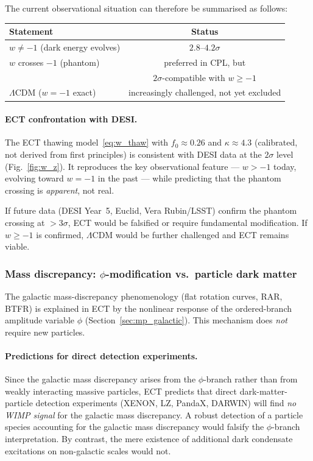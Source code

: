 \documentclass[11pt,a4paper]{article}
\numberwithin{equation}{section}
\begin{document}
\noindent
The current observational situation can therefore be
summarised as follows:
\begin{center}
\renewcommand{\arraystretch}{1.2}
\begin{tabular}{lc}
\hline\hline
Statement & Status \\
\hline
$w \neq -1$ (dark energy evolves) & $2.8$--$4.2\sigma$ \\
$w$ crosses $-1$ (phantom) &
  preferred in CPL, but \\
 & $2\sigma$-compatible with $w \geq -1$ \\
$\Lambda$CDM ($w = -1$ exact) & increasingly challenged, not yet excluded \\
\hline\hline
\end{tabular}
\end{center}

\paragraph{ECT confrontation with DESI.}
The ECT thawing model~\eqref{eq:w_thaw} with
$f_0 \approx 0.26$ and $\kappa \approx 4.3$ (calibrated,
not derived from first principles) is consistent with
DESI data at the $2\sigma$ level
(Fig.~\ref{fig:w_z}).  It reproduces the key observational
feature --- $w > -1$ today, evolving toward $w = -1$
in the past --- while predicting that the phantom crossing
is \emph{apparent}, not real.

If future data (DESI Year~5, Euclid, Vera Rubin/LSST)
confirm the phantom crossing at $>3\sigma$, ECT would be
falsified or require fundamental modification.  If
$w \geq -1$ is confirmed, $\Lambda$CDM would be further
challenged and ECT remains viable.


\subsubsection{Mass discrepancy: $\phi$-modification vs.\ particle dark matter}

The galactic mass-discrepancy phenomenology (flat rotation
curves, RAR, BTFR) is explained in ECT by the nonlinear
response of the ordered-branch amplitude variable $\phi$
(Section~\ref{sec:mp_galactic}).  This mechanism does
\emph{not} require new particles.

\paragraph{Predictions for direct detection experiments.}
Since the galactic mass discrepancy arises from the
$\phi$-branch rather than from weakly interacting massive
particles, ECT predicts that direct dark-matter-particle detection
experiments (XENON, LZ, PandaX, DARWIN) will find
\emph{no WIMP signal} for the galactic mass discrepancy.
A robust detection of a particle species accounting for
the galactic mass discrepancy would falsify the
$\phi$-branch interpretation.  By contrast, the mere
existence of additional dark condensate excitations on
non-galactic scales would not.
\end{document}

